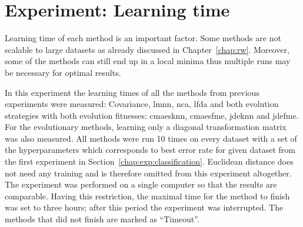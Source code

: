 \documentclass[12pt,a4paper]{report}
\begin{document}

\section{Experiment: Learning time} \label{chap:exp:learning-times}

Learning time of each method is an important factor. Some methods are not scalable to large datasets as already discussed in Chapter~\ref{chap:rw}. Moreover, some of the methods can still end up in a local minima thus multiple runs may be necessary for optimal results.

In this experiment the learning times of all the methods from previous experiments were measured: Covariance, \ac{lmnn}, \ac{nca}, \ac{lfda} and both evolution strategies with both evolution fitnesses: \ac{cmaesknn}, \ac{cmaesfme}, \ac{jdeknn} and \ac{jdefme}. For the evolutionary methods, learning only a diagonal transformation matrix was also measured. All methods were run 10 times on every dataset with a set of the hyperparameters which corresponds to best error rate for given dataset from the first experiment in Section~\ref{chap:exp:classification}. Euclidean distance does not need any training and is therefore omitted from this experiment altogether. The experiment was performed on a single computer so that the results are comparable. Having this restriction, the maximal time for the method to finish was set to three hours; after this period the experiment was interrupted. The methods that did not finish are marked as ``Timeout''.
\end{document}
